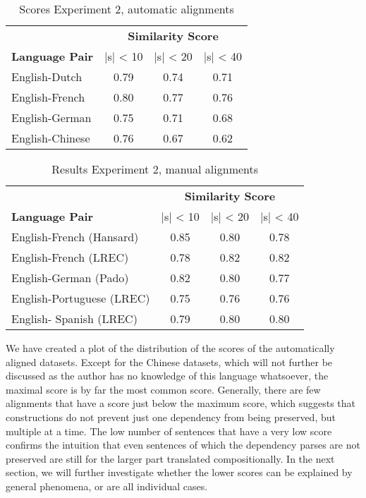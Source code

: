 \begin{table}[!ht]
\centering
\begin{tabular}{|l|c|c|c|}
\hline
&\multicolumn{3}{c|}{\textbf{Similarity Score}}\\
\textbf{Language Pair} & |s| < 10 & |s| < 20 & |s| < 40\\
\hline \hline
English-Dutch & 0.79 & 0.74 & 0.71 \\
\hline
English-French & 0.80 & 0.77 & 0.76\\
\hline
English-German & 0.75 & 0.71 & 0.68 \\
\hline
English-Chinese & 0.76 & 0.67 & 0.62\\
\hline
\end{tabular}
\caption{Scores Experiment 2, automatic alignments}\label{tab:scores3}
\end{table}

\begin{table}[!ht]
\centering
\begin{tabular}{|l|c|c|c|}
\hline
&\multicolumn{3}{c|}{\textbf{Similarity Score}}\\
\textbf{Language Pair} & |s| < 10 & |s| < 20 & |s| < 40\\
\hline \hline
English-French (Hansard) & 0.85 & 0.80 & 0.78 \\
\hline
English-French (LREC) & 0.78 & 0.82 & 0.82 \\
\hline
English-German (Pado) & 0.82 & 0.80 & 0.77 \\
\hline
English-Portuguese (LREC) & 0.75 & 0.76 & 0.76 \\
\hline
English- Spanish (LREC) & 0.79 & 0.80 & 0.80\\
\hline
\end{tabular}
\caption{Results Experiment 2, manual alignments}\label{tab:scores4}
\end{table}

We have created a plot of the distribution of the scores of the automatically aligned datasets. Except for the Chinese datasets, which will not further be discussed as the author has no knowledge of this language whatsoever, the maximal score is by far the most common score. Generally, there are few alignments that have a score just below the maximum score, which suggests that constructions do not prevent just one dependency from being preserved, but multiple at a time. The low number of sentences that have a very low score confirms the intuition that even sentences of which the dependency parses are not preserved are still for the larger part translated compositionally. In the next section, we will further investigate whether the lower scores can be explained by general phenomena, or are all individual cases. 

